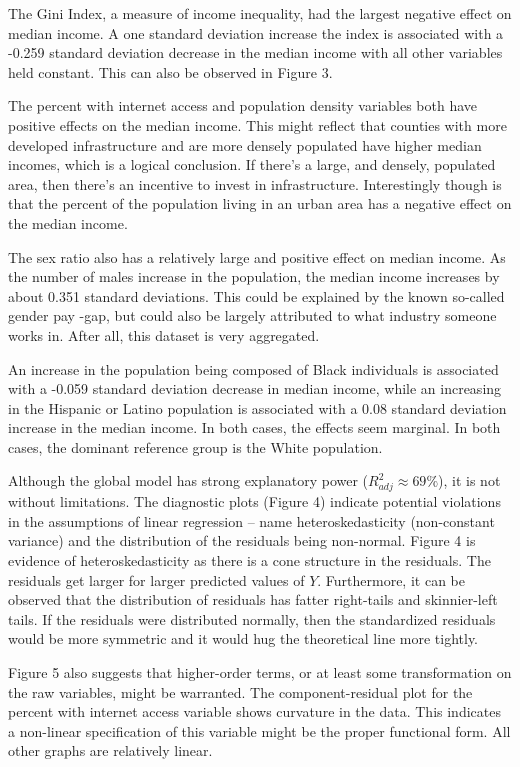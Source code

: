\documentclass[
]{article}
\begin{document}
The Gini Index, a measure of income inequality, had the largest negative
effect on median income. A one standard deviation increase the index is
associated with a -0.259 standard deviation decrease in the median
income with all other variables held constant. This can also be observed
in Figure 3.

The percent with internet access and population density variables both
have positive effects on the median income. This might reflect that
counties with more developed infrastructure and are more densely
populated have higher median incomes, which is a logical conclusion. If
there's a large, and densely, populated area, then there's an incentive
to invest in infrastructure. Interestingly though is that the percent of
the population living in an urban area has a negative effect on the
median income.

The sex ratio also has a relatively large and positive effect on median
income. As the number of males increase in the population, the median
income increases by about 0.351 standard deviations. This could be
explained by the known so-called gender pay -gap, but could also be
largely attributed to what industry someone works in. After all, this
dataset is very aggregated.

An increase in the population being composed of Black individuals is
associated with a -0.059 standard deviation decrease in median income,
while an increasing in the Hispanic or Latino population is associated
with a 0.08 standard deviation increase in the median income. In both
cases, the effects seem marginal. In both cases, the dominant reference
group is the White population.

Although the global model has strong explanatory power
(\(R_{adj}^{2} \approx 69\%\)), it is not without limitations. The
diagnostic plots (Figure 4) indicate potential violations in the
assumptions of linear regression -- name heteroskedasticity
(non-constant variance) and the distribution of the residuals being
non-normal. Figure 4 is evidence of heteroskedasticity as there is a
cone structure in the residuals. The residuals get larger for larger
predicted values of \(Y\). Furthermore, it can be observed that the
distribution of residuals has fatter right-tails and skinnier-left
tails. If the residuals were distributed normally, then the standardized
residuals would be more symmetric and it would hug the theoretical line
more tightly.

Figure 5 also suggests that higher-order terms, or at least some
transformation on the raw variables, might be warranted. The
component-residual plot for the percent with internet access variable
shows curvature in the data. This indicates a non-linear specification
of this variable might be the proper functional form. All other graphs
are relatively linear.
\end{document}
